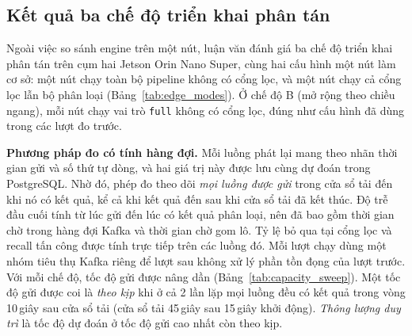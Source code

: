 \subsection{Kết quả ba chế độ triển khai phân tán}

Ngoài việc so sánh engine trên một nút, luận văn đánh giá ba chế độ triển khai phân tán trên cụm hai Jetson Orin Nano Super, cùng hai cấu hình một nút làm cơ sở: một nút chạy toàn bộ pipeline không có cổng lọc, và một nút chạy cả cổng lọc lẫn bộ phân loại (Bảng~\ref{tab:edge_modes}). Ở chế độ B (mở rộng theo chiều ngang), mỗi nút chạy vai trò \texttt{full} không có cổng lọc, đúng như cấu hình đã dùng trong các lượt đo trước.

\textbf{Phương pháp đo có tính hàng đợi.} Mỗi luồng phát lại mang theo nhãn thời gian gửi và số thứ tự dòng, và hai giá trị này được lưu cùng dự đoán trong PostgreSQL. Nhờ đó, phép đo theo dõi \emph{mọi luồng được gửi} trong cửa sổ tải đến khi nó có kết quả, kể cả khi kết quả đến sau khi cửa sổ tải đã kết thúc. Độ trễ đầu cuối tính từ lúc gửi đến lúc có kết quả phân loại, nên đã bao gồm thời gian chờ trong hàng đợi Kafka và thời gian chờ gom lô. Tỷ lệ bỏ qua tại cổng lọc và recall tấn công được tính trực tiếp trên các luồng đó. Mỗi lượt chạy dùng một nhóm tiêu thụ Kafka riêng để lượt sau không xử lý phần tồn đọng của lượt trước. Với mỗi chế độ, tốc độ gửi được nâng dần (Bảng~\ref{tab:capacity_sweep}). Một tốc độ gửi được coi là \emph{theo kịp} khi ở cả 2 lần lặp mọi luồng đều có kết quả trong vòng 10\,giây sau cửa sổ tải (cửa sổ tải 45\,giây sau 15\,giây khởi động). \emph{Thông lượng duy trì} là tốc độ dự đoán ở tốc độ gửi cao nhất còn theo kịp.

